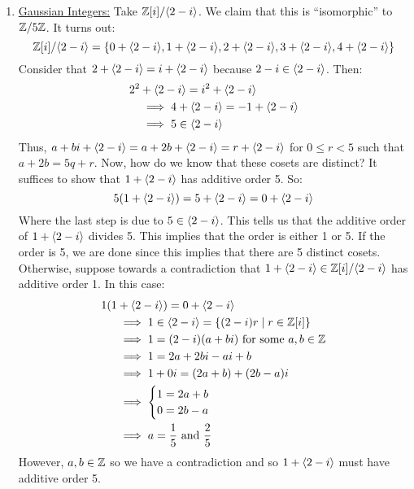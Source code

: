 \documentclass[letterpaper]{article}
\begin{document}
\begin{enumerate}
    \item \underline{Gaussian Integers:} Take $\mathbb{Z}[i] / \langle 2 - i \rangle$. We claim that this is ``isomorphic'' to $\mathbb{Z} / 5\mathbb{Z}$. It turns out:
    \[\mathbb{Z}[i] / \langle 2 - i \rangle = \{0 + \langle 2 - i \rangle, 1 + \langle 2 - i \rangle, 2 + \langle 2 - i \rangle, 3 + \langle 2 - i \rangle, 4 + \langle 2 - i \rangle\}\] 
    Consider that $2 + \langle 2 - i \rangle = i + \langle 2 - i \rangle$ because $2 - i \in \langle 2 - i \rangle$. Then:
    \begin{equation*}
        \begin{aligned}
            2^2 &+ \langle 2 - i \rangle = i^2 + \langle 2 - i \rangle \\ 
                &\implies 4 + \langle 2 - i \rangle = -1 + \langle 2 - i \rangle \\ 
                &\implies 5 \in \langle 2 - i \rangle
        \end{aligned}
    \end{equation*}
    Thus, $a + bi + \langle 2 - i \rangle = a + 2b + \langle 2 - i \rangle = r + \langle 2 - i \rangle$ for $0 \leq r < 5$ such that $a + 2b = 5q + r$. Now, how do we know that these cosets are distinct? It suffices to show that $1 + \langle 2 - i \rangle$ has additive order 5. So: 
    \[5(1 + \langle 2 - i \rangle) = 5 + \langle 2 - i \rangle = 0 + \langle 2 - i \rangle\]
    Where the last step is due to $5 \in \langle 2 - i \rangle$. This tells us that the additive order of $1 + \langle 2 - i \rangle$ divides 5. This implies that the order is either 1 or 5. If the order is 5, we are done since this implies that there are 5 distinct cosets. Otherwise, suppose towards a contradiction that $1 + \langle 2 - i \rangle \in \mathbb{Z}[i] / \langle 2 - i \rangle$ has additive order 1. In this case:
    \begin{equation*}
        \begin{aligned}
            1(1 &+ \langle 2 - i \rangle) = 0 + \langle 2 - i \rangle \\ 
                &\implies 1 \in \langle 2 - i \rangle = \{(2 - i)r \mid r \in \mathbb{Z}[i]\}\\ 
                &\implies 1 = (2 - i)(a + bi) \text{ for some } a, b \in \mathbb{Z} \\
                &\implies 1 = 2a + 2bi - ai + b \\ 
                &\implies 1 + 0i = (2a + b) + (2b - a)i \\ 
                &\implies \begin{cases}
                    1 = 2a + b \\ 
                    0 = 2b - a 
                \end{cases}  \\ 
                &\implies a = \frac{1}{5} \text{ and } \frac{2}{5}
        \end{aligned}
    \end{equation*}
    However, $a, b \in \mathbb{Z}$ so we have a contradiction and so $1 + \langle 2 - i \rangle$ must have additive order 5. 
\end{enumerate}
\end{document}
